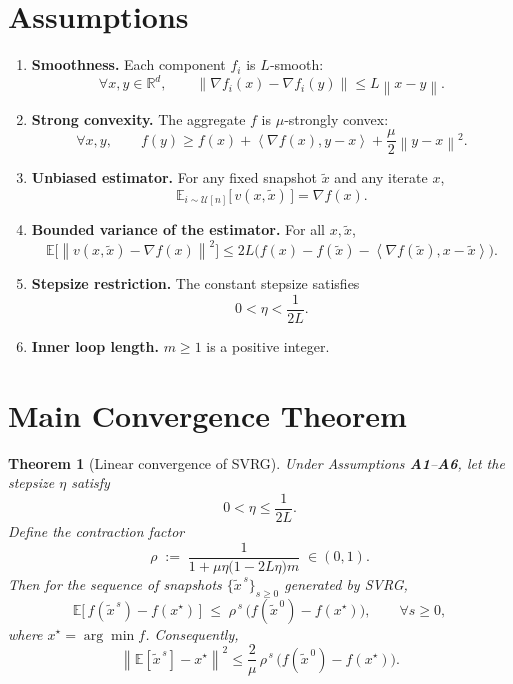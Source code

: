 \documentclass{article}
\newtheorem{theorem}{Theorem}
\newcommand{\E}{\mathbb{E}}
\newcommand{\norm}[1]{\left\lVert#1\right\rVert}
\newcommand{\inner}[2]{\left\langle #1,#2\right\rangle}
\begin{document}
\section*{Assumptions}
\begin{enumerate}[label=\textbf{A\arabic*}:, leftmargin=*]
\item \textbf{Smoothness.} Each component $f_i$ is $L$‑smooth:
\[
    \forall x,y\in\mathbb{R}^d,\qquad
    \norm{\nabla f_i(x)-\nabla f_i(y)}\le L\norm{x-y}.
\tag{A1}
\]
\item \textbf{Strong convexity.} The aggregate $f$ is $\mu$‑strongly convex:
\[
    \forall x,y,\qquad
    f(y)\ge f(x)+\inner{\nabla f(x)}{y-x}+\frac{\mu}{2}\norm{y-x}^2.
\tag{A2}
\]
\item \textbf{Unbiased estimator.} For any fixed snapshot $\tilde{x}$ and any iterate $x$,
\[
    \E_{i\sim\mathcal{U}[n]}\!\bigl[\,v(x,\tilde{x})\,\bigr]
    =\nabla f(x).
\tag{A3}
\]
\item \textbf{Bounded variance of the estimator.} For all $x,\tilde{x}$,
\[
    \E\!\bigl[\norm{v(x,\tilde{x})-\nabla f(x)}^2\bigr]
    \le 2L\bigl(f(x)-f(\tilde{x})- \inner{\nabla f(\tilde{x})}{x-\tilde{x}}\bigr).
\tag{A4}
\]
\item \textbf{Stepsize restriction.} The constant stepsize satisfies
\[
    0<\eta < \frac{1}{2L}.
\tag{A5}
\]
\item \textbf{Inner loop length.} $m\ge 1$ is a positive integer.
\end{enumerate}

\section*{Main Convergence Theorem}
\begin{theorem}[Linear convergence of SVRG]\label{thm:linear}
Under Assumptions \textbf{A1}–\textbf{A6}, let the stepsize $\eta$ satisfy
\[
    0<\eta \le \frac{1}{2L}.
\]
Define the contraction factor
\[
    \rho \;:=\; \frac{1}{1+\mu\eta\bigl(1-2L\eta\bigr)m}\;\in(0,1).
\tag{3}
\]
Then for the sequence of snapshots $\{\tilde{x}^{\,s}\}_{s\ge0}$ generated by SVRG,
\[
    \E\!\bigl[\,f(\tilde{x}^{\,s})-f(x^\star)\,\bigr]
    \;\le\;
    \rho^{\,s}\,\bigl(f(\tilde{x}^{\,0})-f(x^\star)\bigr),
    \qquad\forall s\ge0,
\tag{4}
\]
where $x^\star=\arg\min f$.
Consequently,
\[
    \norm{\E[\tilde{x}^{\,s}]-x^\star}^2
    \le \frac{2}{\mu}\,\rho^{\,s}\,\bigl(f(\tilde{x}^{\,0})-f(x^\star)\bigr).
\tag{5}
\]
\end{theorem}
\end{document}
